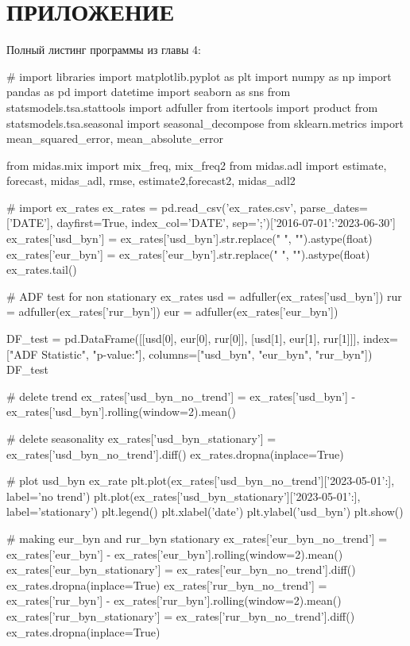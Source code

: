 \documentclass[a4paper, 14pt]{extarticle}
\begin{document}
	\section{ПРИЛОЖЕНИЕ}
	Полный листинг программы из главы 4:
	\begin{python}
		# import libraries
	import matplotlib.pyplot as plt
	import numpy as np
	import pandas as pd
	import datetime
	import seaborn as sns
	from statsmodels.tsa.stattools import adfuller
	from itertools import product
	from statsmodels.tsa.seasonal import seasonal_decompose
	from sklearn.metrics import mean_squared_error, mean_absolute_error
	
	
	from midas.mix import mix_freq, mix_freq2
	from midas.adl import estimate, forecast, midas_adl, rmse, estimate2,forecast2, midas_adl2
		
		# import ex_rates
		ex_rates = pd.read_csv('ex_rates.csv', parse_dates=['DATE'], dayfirst=True, index_col='DATE', sep=';')['2016-07-01':'2023-06-30']
		ex_rates['usd_byn'] = ex_rates['usd_byn'].str.replace(" ", "").astype(float)
		ex_rates['eur_byn'] = ex_rates['eur_byn'].str.replace(" ", "").astype(float)
		ex_rates.tail()
		
		# ADF test for non stationary ex_rates
		usd = adfuller(ex_rates['usd_byn'])
		rur = adfuller(ex_rates['rur_byn'])
		eur = adfuller(ex_rates['eur_byn'])
		
		DF_test = pd.DataFrame([[usd[0], eur[0], rur[0]], [usd[1], eur[1], rur[1]]], index=["ADF Statistic", "p-value:"], columns=["usd_byn", "eur_byn", "rur_byn"])
		DF_test
		
		# delete trend
		ex_rates['usd_byn_no_trend'] = ex_rates['usd_byn'] - ex_rates['usd_byn'].rolling(window=2).mean()
		
		# delete seasonality
		ex_rates['usd_byn_stationary'] = ex_rates['usd_byn_no_trend'].diff()
		ex_rates.dropna(inplace=True)
		
		# plot usd_byn ex_rate
		plt.plot(ex_rates['usd_byn_no_trend']['2023-05-01':], label='no trend')
		plt.plot(ex_rates['usd_byn_stationary']['2023-05-01':], label='stationary')
		plt.legend()
		plt.xlabel('date')
		plt.ylabel('usd_byn')
		plt.show()
		
	# making eur_byn and rur_byn stationary
	ex_rates['eur_byn_no_trend'] = ex_rates['eur_byn'] - ex_rates['eur_byn'].rolling(window=2).mean()
	ex_rates['eur_byn_stationary'] = ex_rates['eur_byn_no_trend'].diff()
	ex_rates.dropna(inplace=True)
	ex_rates['rur_byn_no_trend'] = ex_rates['rur_byn'] - ex_rates['rur_byn'].rolling(window=2).mean()
	ex_rates['rur_byn_stationary'] = ex_rates['rur_byn_no_trend'].diff()
	ex_rates.dropna(inplace=True)
	

\end{python}
\end{document}
